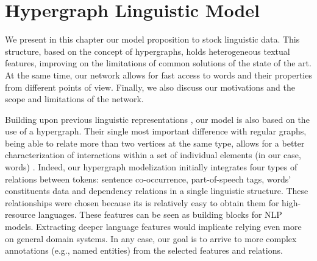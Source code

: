 \chapter{Hypergraph Linguistic Model}
\label{chap:ling_net}
\begin{abstractchap}
We present in this chapter our model proposition to stock linguistic data. This structure, based on the concept of hypergraphs, holds heterogeneous textual features, improving on the limitations of common solutions of the state of the art. At the same time, our network allows for fast access to words and their properties from different points of view. Finally, we also discuss our motivations and the scope and limitations of the network. 
\end{abstractchap}
\minitoc


Building upon previous linguistic representations \cite{2007.Klapaftis.UOY,2011.Haishan.AHypergraphbased,2014.Tao.Qian.LexicalChainHypergraphWSI}, our model is also based on the use of a hypergraph.
Their single most important difference with regular graphs, being able to relate more than two vertices at the same type, allows for a better characterization of interactions within a set of individual elements (in our case, words) \cite{heintz2014beyond}. Indeed, our hypergraph modelization initially integrates four types of relations between tokens: sentence co-occurrence, part-of-speech tags, words' constituents data and dependency relations in a single linguistic structure. These relationships were chosen because its is relatively easy to obtain them for high-resource languages. These features can be seen as building blocks for NLP models. Extracting deeper language features would implicate relying even more on general domain systems. In any case, our goal is to arrive to more complex annotations (e.g., named entities) from the selected features and relations.
 
